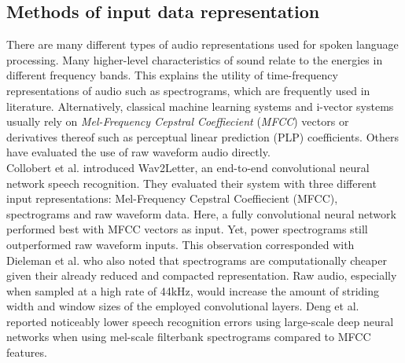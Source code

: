 \subsection{Methods of input data representation}
There are many different types of audio representations used for spoken language processing. Many higher-level characteristics of sound relate to the energies in different frequency bands. This explains the utility of time-frequency representations of audio such as spectrograms, which are frequently used in literature.\cite{montavon2009deep, dieleman2013multiscale, lee2009unsupervised, wulfing2012unsupervised, henaff2011unsupervised} Alternatively, classical machine learning systems and i-vector systems usually rely on \emph{Mel-Frequency Cepstral Coeffiecient} (\emph{MFCC}) vectors\cite{richardson2015unified, dehak2011front, garcia2011analysis} or derivatives thereof such as perceptual linear prediction (PLP) coefficients\cite{gonzalez2014automatic}. Others have evaluated the use of raw waveform audio directly\cite{dieleman2014end, collobert2016wav2letter}.\\
Collobert et al. introduced Wav2Letter, an end-to-end convolutional neural network speech recognition.\cite{collobert2016wav2letter} They evaluated their system with three different input representations: Mel-Frequency Cepstral Coeffiecient (MFCC), spectrograms and raw waveform data. Here, a fully convolutional neural network performed best with MFCC vectors as input. Yet, power spectrograms still outperformed raw waveform inputs. This observation corresponded with Dieleman et al. who also noted that spectrograms are computationally cheaper given their already reduced and compacted representation.\cite{dieleman2014end} Raw audio, especially when sampled at a high rate of 44kHz, would increase the amount of striding width and window sizes of the employed convolutional layers.  
Deng et al. reported noticeably lower speech recognition errors using large-scale deep neural networks when using mel-scale filterbank spectrograms compared to MFCC features.\cite{deng2013recent}


